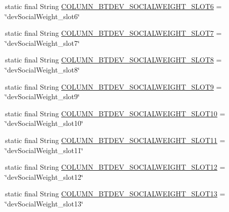 \begin{DoxyCompactItemize}
\item 
static final String \hyperlink{classcom_1_1copelabs_1_1oiframework_1_1socialproximity_1_1_s_q_lite_helper_a57d1f8cfa7ecf0270429abceaad22ffd}{C\+O\+L\+U\+M\+N\+\_\+\+B\+T\+D\+E\+V\+\_\+\+S\+O\+C\+I\+A\+L\+W\+E\+I\+G\+H\+T\+\_\+\+S\+L\+O\+T6} = \char`\"{}dev\+Social\+Weight\+\_\+slot6\char`\"{}
\item 
static final String \hyperlink{classcom_1_1copelabs_1_1oiframework_1_1socialproximity_1_1_s_q_lite_helper_afc69a5634937d96fdd7676df3e6d5713}{C\+O\+L\+U\+M\+N\+\_\+\+B\+T\+D\+E\+V\+\_\+\+S\+O\+C\+I\+A\+L\+W\+E\+I\+G\+H\+T\+\_\+\+S\+L\+O\+T7} = \char`\"{}dev\+Social\+Weight\+\_\+slot7\char`\"{}
\item 
static final String \hyperlink{classcom_1_1copelabs_1_1oiframework_1_1socialproximity_1_1_s_q_lite_helper_a61d8b0a9df472b55f198dd238fc24aa7}{C\+O\+L\+U\+M\+N\+\_\+\+B\+T\+D\+E\+V\+\_\+\+S\+O\+C\+I\+A\+L\+W\+E\+I\+G\+H\+T\+\_\+\+S\+L\+O\+T8} = \char`\"{}dev\+Social\+Weight\+\_\+slot8\char`\"{}
\item 
static final String \hyperlink{classcom_1_1copelabs_1_1oiframework_1_1socialproximity_1_1_s_q_lite_helper_a08bec33eb2308058ba8997ce0353f27d}{C\+O\+L\+U\+M\+N\+\_\+\+B\+T\+D\+E\+V\+\_\+\+S\+O\+C\+I\+A\+L\+W\+E\+I\+G\+H\+T\+\_\+\+S\+L\+O\+T9} = \char`\"{}dev\+Social\+Weight\+\_\+slot9\char`\"{}
\item 
static final String \hyperlink{classcom_1_1copelabs_1_1oiframework_1_1socialproximity_1_1_s_q_lite_helper_a7675ecdac183b3e13daa79f7b06160ef}{C\+O\+L\+U\+M\+N\+\_\+\+B\+T\+D\+E\+V\+\_\+\+S\+O\+C\+I\+A\+L\+W\+E\+I\+G\+H\+T\+\_\+\+S\+L\+O\+T10} = \char`\"{}dev\+Social\+Weight\+\_\+slot10\char`\"{}
\item 
static final String \hyperlink{classcom_1_1copelabs_1_1oiframework_1_1socialproximity_1_1_s_q_lite_helper_a62e6bee5db05bbd5868d554ccff5d422}{C\+O\+L\+U\+M\+N\+\_\+\+B\+T\+D\+E\+V\+\_\+\+S\+O\+C\+I\+A\+L\+W\+E\+I\+G\+H\+T\+\_\+\+S\+L\+O\+T11} = \char`\"{}dev\+Social\+Weight\+\_\+slot11\char`\"{}
\item 
static final String \hyperlink{classcom_1_1copelabs_1_1oiframework_1_1socialproximity_1_1_s_q_lite_helper_a2488c199a40537f16fb9350fa0367d1f}{C\+O\+L\+U\+M\+N\+\_\+\+B\+T\+D\+E\+V\+\_\+\+S\+O\+C\+I\+A\+L\+W\+E\+I\+G\+H\+T\+\_\+\+S\+L\+O\+T12} = \char`\"{}dev\+Social\+Weight\+\_\+slot12\char`\"{}
\item 
static final String \hyperlink{classcom_1_1copelabs_1_1oiframework_1_1socialproximity_1_1_s_q_lite_helper_a44ed4923bd36d28ad85cc44c3b55b1ba}{C\+O\+L\+U\+M\+N\+\_\+\+B\+T\+D\+E\+V\+\_\+\+S\+O\+C\+I\+A\+L\+W\+E\+I\+G\+H\+T\+\_\+\+S\+L\+O\+T13} = \char`\"{}dev\+Social\+Weight\+\_\+slot13\char`\"{}

\end{DoxyCompactItemize}
